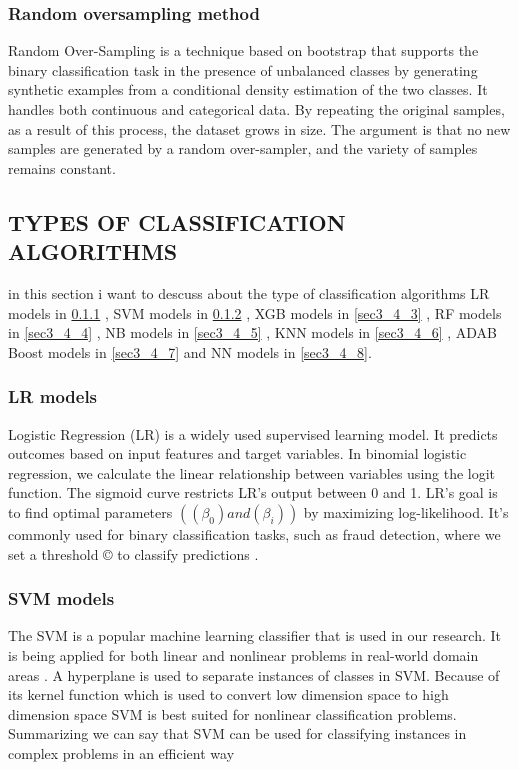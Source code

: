 \documentclass[preprint,12pt]{elsarticle}
\begin{document}
\subsubsection{Random oversampling method}
\label{sec3_3_1}
Random Over-Sampling is a technique based on bootstrap that supports the binary classification task in the presence of unbalanced classes by generating synthetic examples from a conditional density estimation of the two classes. It handles both continuous and categorical data. By repeating the original samples, as a result of this process, the dataset grows in size. The argument is that no new samples are generated by a random over-sampler, and the variety of samples remains constant.



\subsection{TYPES OF CLASSIFICATION ALGORITHMS}
\label{sec3_4}


in this section i want to descuss about the type of classification algorithms 
LR models in \ref{sec3_4_1} , 
SVM models in \ref{sec3_4_2} ,  
XGB models in \ref{sec3_4_3} , 
RF models in \ref{sec3_4_4} , 
NB models in \ref{sec3_4_5} , 
KNN models in \ref{sec3_4_6} , 
ADAB Boost models in \ref{sec3_4_7} and 
NN models in \ref{sec3_4_8}.


\subsubsection{LR models}
\label{sec3_4_1}
 Logistic Regression (LR) is a widely used supervised learning model. It predicts outcomes based on input features and target variables. In binomial logistic regression, we calculate the linear relationship between variables using the logit function. The sigmoid curve restricts LR’s output between 0 and 1. LR’s goal is to find optimal parameters $((\beta_0) and (\beta_i))$ by maximizing log-likelihood. It’s commonly used for binary classification tasks, such as fraud detection, where we set a threshold © to classify predictions .

\subsubsection{SVM models}
\label{sec3_4_2}
The SVM is a popular machine learning classifier that is used in our research. It is being applied for both
linear and nonlinear problems in real-world domain areas . A hyperplane is used to separate instances
of classes in SVM. Because of its kernel function which is used to convert low dimension space to high dimension space SVM is best suited for nonlinear classification problems. Summarizing we can say that SVM can be used for classifying instances in complex problems in an efficient way
\end{document}
